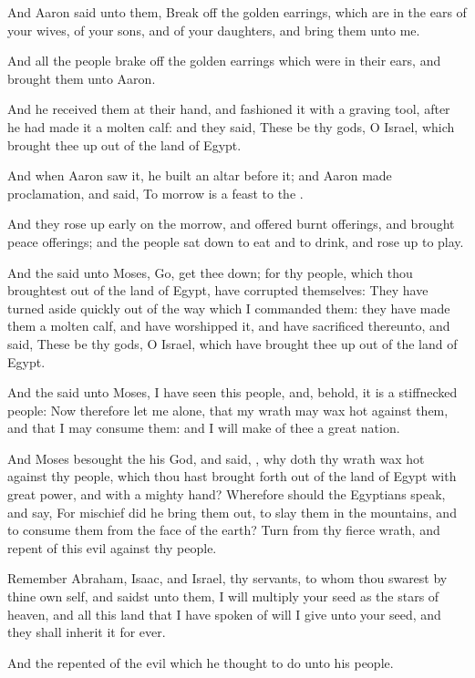 \Verse And Aaron said unto them, Break off the golden earrings, which are in the ears of your wives, of your sons, and of your daughters, and bring them unto me.

\Verse And all the people brake off the golden earrings which were in their ears, and brought them unto Aaron.

\Verse And he received them at their hand, and fashioned it with a graving tool, after he had made it a molten calf: and they said, These be thy gods, O Israel, which brought thee up out of the land of Egypt.

\Verse And when Aaron saw it, he built an altar before it; and Aaron made proclamation, and said, To morrow is a feast to the \LORD.

\Verse And they rose up early on the morrow, and offered burnt offerings, and brought peace offerings; and the people sat down to eat and to drink, and rose up to play.

\Verse And the \LORD said unto Moses, Go, get thee down; for thy people, which thou broughtest out of the land of Egypt, have corrupted themselves: \Verse They have turned aside quickly out of the way which I commanded them: they have made them a molten calf, and have worshipped it, and have sacrificed thereunto, and said, These be thy gods, O Israel, which have brought thee up out of the land of Egypt.

\Verse And the \LORD said unto Moses, I have seen this people, and, behold, it is a stiffnecked people: \Verse Now therefore let me alone, that my wrath may wax hot against them, and that I may consume them: and I will make of thee a great nation.

\Verse And Moses besought the \LORD his God, and said, \LORD, why doth thy wrath wax hot against thy people, which thou hast brought forth out of the land of Egypt with great power, and with a mighty hand?  \Verse Wherefore should the Egyptians speak, and say, For mischief did he bring them out, to slay them in the mountains, and to consume them from the face of the earth? Turn from thy fierce wrath, and repent of this evil against thy people.

\Verse Remember Abraham, Isaac, and Israel, thy servants, to whom thou swarest by thine own self, and saidst unto them, I will multiply your seed as the stars of heaven, and all this land that I have spoken of will I give unto your seed, and they shall inherit it for ever.

\Verse And the \LORD repented of the evil which he thought to do unto his people.

